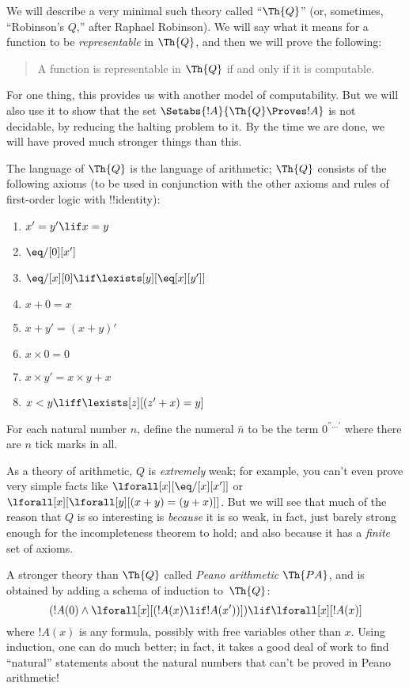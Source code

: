 \documentclass[../../include/open-logic-section]{subfiles}
\begin{document}

We will describe a very minimal such theory called ``$\Th{Q}$'' (or,
sometimes, ``Robinson's $Q$,'' after Raphael Robinson). We will say
what it means for a function to be \emph{representable} in $\Th{Q}$, and
then we will prove the following:
\begin{quote}
  A function is representable in $\Th{Q}$ if and only if it is computable.
\end{quote}
For one thing, this provides us with another model of
computability. But we will also use it to show that the set
$\Setabs{!A}{\Th{Q} \Proves !A}$ is not decidable, by reducing the
halting problem to it. By the time we are done, we will have proved
much stronger things than this.

The language of $\Th{Q}$ is the language of
arithmetic; $\Th{Q}$ consists of the following axioms
(to be used in conjunction with the other axioms and rules of
first-order logic with !!{identity}):
\begin{enumerate}
\item $x' = y' \lif x = y$
\item $\eq/[0][x']$
\item $\eq/[x][0] \lif \lexists[y][\eq[x][y']]$
\item $x+0 = x$
\item $x+ y' = (x+y)'$
\item $x \times 0 = 0$
\item $x \times y' = x \times y + x$
\item $x < y \liff \lexists[z][(z' + x) = y]$
\end{enumerate}
For each natural number $n$, define the numeral $\bar n$ to be the
term $0^{''\ldots'}$ where there are $n$ tick marks in all.

As a theory of arithmetic, $Q$ is \emph{extremely} weak; for example,
you can't even prove very simple facts like $\lforall[x][\eq/[x][x']]$
or $\lforall[x][\lforall[y][(x+ y) = (y+x)]]$.  But we will see that
much of the reason that $Q$ is so interesting is \emph{because} it is
so weak, in fact, just barely strong enough for the incompleteness
theorem to hold; and also because it has a \emph{finite} set of
axioms.

A stronger theory than $\Th{Q}$ called \emph{Peano arithmetic} $\Th{PA}$, and
is obtained by adding a schema of induction to~$\Th{Q}$:
\[
(!A(0) \land \lforall[x][(!A(x) \lif !A(x'))]) \lif \lforall[x][!A(x)]
\]
where $!A(x)$ is any formula, possibly with free variables other than
$x$.  Using induction, one can do much better; in fact, it takes a
good deal of work to find ``natural'' statements about the natural
numbers that can't be proved in Peano arithmetic!
\end{document}
